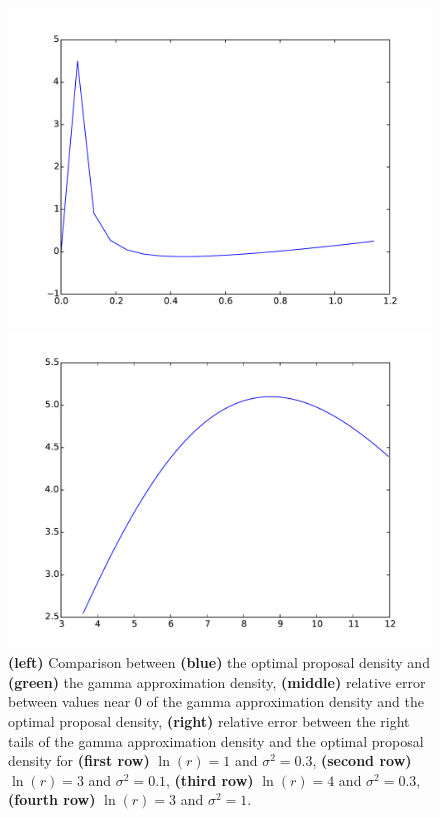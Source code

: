 \documentclass{article}
\begin{document}
\begin{figure}[htb]
\begin{minipage}{.3\textwidth}
	\end{minipage}
	\begin{minipage}{.3\textwidth}
		\centering
		\includegraphics[width=0.97\linewidth]{bootstrap-filter/relative_beginning_complex_3_10.pdf}
	\end{minipage}
	\begin{minipage}{.3\textwidth}
		\centering
		\includegraphics[width=0.97\linewidth]{bootstrap-filter/relative_tail_complex_3_10.pdf}
	\end{minipage}
	\caption{\textbf{(left)} Comparison between \textbf{(blue)} the optimal proposal density and \textbf{(green)} the gamma approximation density, \textbf{(middle)} relative error between values near 0 of the gamma approximation density and the optimal proposal density, \textbf{(right)} relative error between the right tails of the gamma approximation density and the optimal proposal density for \textbf{(first row)} $\ln(r)=1$ and $\sigma^2 = 0.3$, \textbf{(second row)} $\ln(r)=3$ and $\sigma^2 = 0.1$, \textbf{(third row)} $\ln(r)=4$ and $\sigma^2 = 0.3$, \textbf{(fourth row)} $\ln(r)=3$ and $\sigma^2 = 1$.}
	\label{fig:movingcomplex}
\end{figure}
\end{document}
